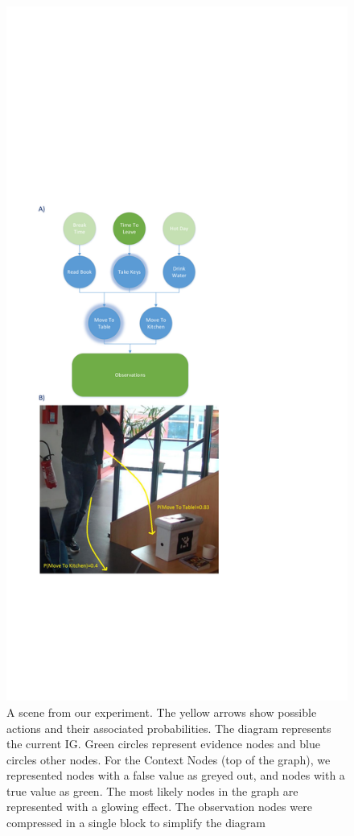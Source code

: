  \begin{figure}[ht!]
	\centering
	\includegraphics[trim={2cm 11cm 11cm 17cm},clip,scale=0.45]{img/situation_assessment/cookieScenario.pdf}
	\caption[Intention Graph]{A scene from our experiment. The yellow arrows show possible actions and their associated probabilities. The diagram represents the current IG. Green circles represent evidence nodes and blue circles other nodes. For the Context Nodes (top of the graph), we represented nodes with a false value as greyed out, and nodes with a true value as green. The most likely nodes in the graph are represented with a glowing effect. The observation nodes were compressed in a single block to simplify the diagram}
	\label{fig:situation_assessment-intention_graph}
\end{figure}

